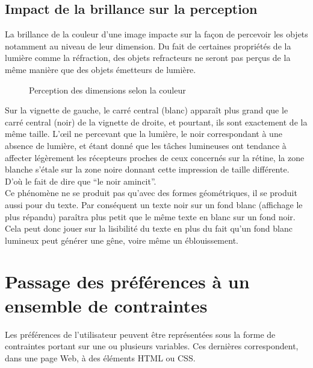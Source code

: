 \documentclass[french,a4paper]{report}
\begin{document}
{\subsection{Impact de la brillance sur la perception}
La brillance de la couleur d'une image impacte sur la façon de percevoir les
objets notamment au niveau de leur dimension. Du fait de certaines propriétés de
la lumière comme la réfraction,
des objets refracteurs ne seront pas perçus de la même manière que des objets
émetteurs de lumière. \\
\begin{figure}[H]
\centering
{}
\caption{Perception des dimensions selon la couleur}
\end{figure}
Sur la vignette de gauche, le carré central (blanc) apparaît plus grand que le
carré central (noir) de la vignette de droite, et pourtant, ils sont exactement
de la même taille. L'œil ne percevant que la lumière, le noir correspondant à
une absence de lumière, et étant donné que les tâches lumineuses ont tendance à
affecter légèrement les récepteurs proches de ceux concernés sur la rétine, la
zone blanche s'étale sur la zone noire donnant cette impression de
taille différente. D'où le fait de dire que \enquote{le noir amincit}.\\
Ce phénomène ne se produit pas qu'avec des formes géométriques, il se produit
aussi pour du texte. Par conséquent un texte noir sur un fond blanc (affichage
le plus répandu) paraîtra plus petit que le même texte en blanc sur un fond
noir. Cela peut donc jouer sur la lisibilité du texte en plus du fait qu'un fond
blanc lumineux peut générer une gêne, voire même un éblouissement.
\section{Passage des préférences à un ensemble de contraintes}
Les préférences de l'utilisateur peuvent être représentées sous la forme de
contraintes portant sur une ou plusieurs variables. Ces dernières correspondent,
dans une page Web, à des éléments HTML ou CSS.
}
\end{document}
